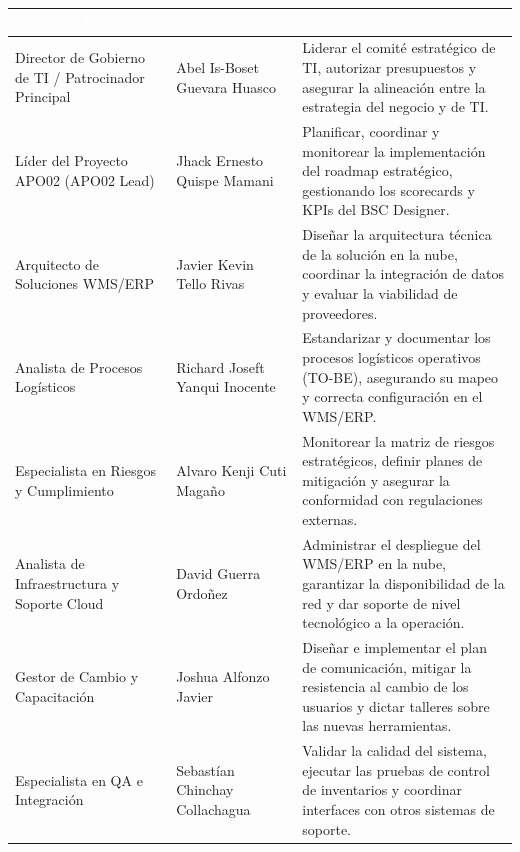 \documentclass[11pt]{article}
\newcounter{none} %
\begin{document}
\vspace{0.3cm}
\setlength{\tabcolsep}{6pt}
\renewcommand{\arraystretch}{1.5}
{\def\LTcaptype{none}
\begin{longtable}[]{@{}
  >{\raggedright\arraybackslash}p{0.32\linewidth}
  >{\raggedright\arraybackslash}p{0.25\linewidth}
  >{\raggedright\arraybackslash}p{0.43\linewidth}@{}}
\rowcolor{DeepNavy}
\textcolor{white}{\textbf{Rol en el Proyecto}} & \textcolor{white}{\textbf{Responsable}} & \textcolor{white}{\textbf{Funciones Clave}} \\ \hline
\endhead
Director de Gobierno de TI / Patrocinador Principal & Abel Is-Boset Guevara Huasco & Liderar el comité estratégico de TI, autorizar presupuestos y asegurar la alineación entre la estrategia del negocio y de TI. \\ \hline
\rowcolor{LightGray}
Líder del Proyecto APO02 (APO02 Lead) & Jhack Ernesto Quispe Mamani & Planificar, coordinar y monitorear la implementación del roadmap estratégico, gestionando los scorecards y KPIs del BSC Designer. \\ \hline
Arquitecto de Soluciones WMS/ERP & Javier Kevin Tello Rivas & Diseñar la arquitectura técnica de la solución en la nube, coordinar la integración de datos y evaluar la viabilidad de proveedores. \\ \hline
\rowcolor{LightGray}
Analista de Procesos Logísticos & Richard Joseft Yanqui Inocente & Estandarizar y documentar los procesos logísticos operativos (TO-BE), asegurando su mapeo y correcta configuración en el WMS/ERP. \\ \hline
Especialista en Riesgos y Cumplimiento & Alvaro Kenji Cuti Magaño & Monitorear la matriz de riesgos estratégicos, definir planes de mitigación y asegurar la conformidad con regulaciones externas. \\ \hline
\rowcolor{LightGray}
Analista de Infraestructura y Soporte Cloud & David Guerra Ordoñez & Administrar el despliegue del WMS/ERP en la nube, garantizar la disponibilidad de la red y dar soporte de nivel tecnológico a la operación. \\ \hline
Gestor de Cambio y Capacitación & Joshua Alfonzo Javier & Diseñar e implementar el plan de comunicación, mitigar la resistencia al cambio de los usuarios y dictar talleres sobre las nuevas herramientas. \\ \hline
\rowcolor{LightGray}
Especialista en QA e Integración & Sebastían Chinchay Collachagua & Validar la calidad del sistema, ejecutar las pruebas de control de inventarios y coordinar interfaces con otros sistemas de soporte. \\ \hline
\end{longtable}
}
\end{document}
